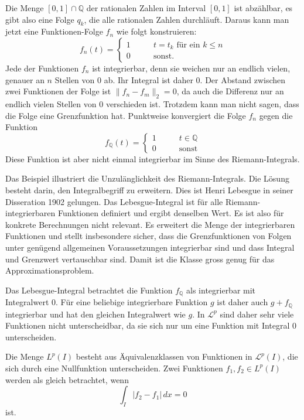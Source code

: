 \begin{beispiel}
Die Menge $[0,1]\cap \mathbb Q$ der rationalen Zahlen im Interval
$[0,1]$ ist abzählbar, es gibt  also eine Folge $q_k$, die alle rationalen
Zahlen durchläuft.
Daraus kann man jetzt eine Funktionen-Folge $f_n$ wie folgt konstruieren:
\[
f_n(t) = \begin{cases} 
1&\qquad \text{$t=t_k$ für ein $k\le n$}\\
0&\qquad\text{sonst}.
\end{cases}
\]
Jede der Funktionen $f_n$ ist integrierbar, denn sie weichen nur an
endlich vielen, genauer an $n$ Stellen von $0$ ab.
Ihr Integral ist daher $0$.
Der Abstand zwischen zwei Funktionen der Folge ist $\| f_n-f_m\|_2 = 0$,
da auch die Differenz nur an endlich vielen Stellen von $0$ verschieden ist.
Trotzdem kann man nicht sagen, dass die Folge eine Grenzfunktion hat.
Punktweise konvergiert die Folge $f_n$ gegen die Funktion
\[
f_{\mathbb Q}(t) = \begin{cases}
1&\qquad t\in\mathbb Q\\
0&\qquad\text{sonst}
\end{cases}
\]
Diese Funktion ist aber nicht einmal integrierbar im Sinne des
Riemann-Integrals.
\end{beispiel}

Das Beispiel illustriert die Unzulänglichkeit des Riemann-Integrals.
Die Lösung besteht darin, den Integralbegriff zu erweitern.
Dies ist Henri Lebesgue in seiner Disseration 1902 gelungen.
Das Lebesgue-Integral ist für alle Riemann-integrierbaren Funktionen
definiert und ergibt denselben Wert.
Es ist also für konkrete Berechnungen nicht relevant.
Es erweitert die Menge der integrierbaren Funktionen und stellt insbesondere
sicher, dass die Grenzfunktionen von Folgen unter genügend allgemeinen
Voraussetzungen integrierbar sind und dass Integral und Grenzwert vertauschbar
sind.
Damit ist die Klasse gross genug für das Approximationsproblem.


Das Lebesgue-Integral betrachtet die Funktion $f_{\mathbb Q}$ 
als integrierbar mit Integralwert $0$.
Für eine beliebige integrierbare Funktion $g$ ist daher auch 
$g+f_{\mathbb Q}$ integrierbar und hat den gleichen Integralwert
wie $g$.
In $\mathcal{L}^p$ sind daher sehr viele Funktionen nicht unterscheidbar,
da sie sich nur um eine Funktion mit Integral $0$ unterscheiden.

\begin{definition}
Die Menge $L^p(I)$ besteht aus Äquivalenzklassen von Funktionen in
$\mathcal{L}^p(I)$, die sich durch eine Nullfunktion unterscheiden.
Zwei Funktionen $f_1,f_2\in L^p(I)$ werden als gleich betrachtet,
wenn
\[
\int_I
|f_2-f_1|
\,dx
=0
\]
ist.
\end{definition}

